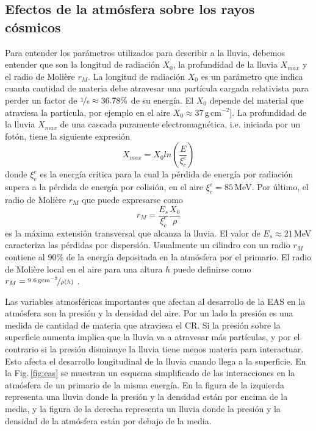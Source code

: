 \subsection{Efectos de la atmósfera sobre los rayos cósmicos}


Para entender los parámetros utilizados para describir a la lluvia, debemos entender que son la longitud de radiación $X_0$, la profundidad de la lluvia $X_{max}$ y el radio de Molière $r_M$. La longitud de radiación  $X_0$ es un parámetro que indica cuanta cantidad de materia debe atravesar una partícula cargada relativista para perder un factor de $\nicefrac{1}{e}\approx 36.78\%$ de su  energía. El $X_0$ depende del material que atraviesa la partícula, por ejemplo en el aire $X_0\approx 37\,$g\,cm$^{-2}$]. La profundidad de la lluvia $X_{max}$ de una cascada puramente electromagnética, i.e. iniciada por un fotón, tiene la siguiente expresión \cite{matthews2005heitler}
\begin{equation}
 	X_{max} = X_0{ln(\frac{E}{\xi^e_c})}
 \end{equation} 
donde  $\xi^e_c$ es la energía crítica para la cual la pérdida de energía por radiación supera a la pérdida de energía por colisión, en el aire $\xi^e_c=85\,$MeV. Por último, el radio de Molière $r_M$ que puede expresarse como 
\begin{equation}
	r_M= \frac{E_s}{\xi^e_c}\frac{X_0}{\rho}
\end{equation}
es la máxima extensión transversal que alcanza la lluvia. El valor de $E_s\approx21\,$MeV caracteriza las pérdidas por dispersión. Usualmente un cilindro con un radio $r_M$ contiene al 90\% de la energía depositada en la atmósfera por el primario. El radio de Molière local en el aire para una altura $h$ puede definirse como $r_M = \nicefrac{9.6\,\text{gcm}^{-2}}{\rho(h)}$ \cite{gora2006universal}. 

Las variables atmosféricas importantes que afectan al desarrollo de la EAS en la atmósfera son la presión y la densidad del aire. Por un lado la presión es una medida de cantidad de materia que atraviesa el CR. Si la presión sobre la superficie aumenta implica que la lluvia va a atravesar más partículas, y por el contrario si la presión disminuye la lluvia tiene menos materia para interactuar. Esto afecta el desarrollo longitudinal de la lluvia cuando llega a la superficie. En la Fig.\,\ref{fig:eas} se muestran un esquema simplificado de las interacciones en la atmósfera de un primario de la misma energía. En la figura de la izquierda representa una lluvia donde la presión y la densidad están por encima de la media, y la figura de la derecha representa un lluvia donde la presión y la densidad de la atmósfera están por debajo de la media.


